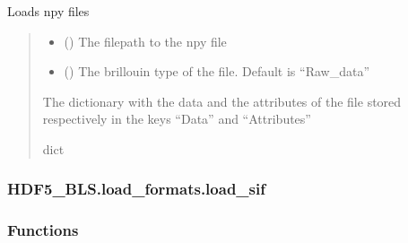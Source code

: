 \documentclass[letterpaper,10pt,english]{sphinxmanual}
\begin{document}
\begin{fulllineitems}
\label{\detokenize{_autosummary/HDF5_BLS.load_formats.load_npy:HDF5_BLS.load_formats.load_npy.load_npy_base}}
\pysigstartsignatures
\pysiglinewithargsret
{}
{\sphinxparamcomma {}}
{}
\pysigstopsignatures
\sphinxAtStartPar
Loads npy files
\begin{quote}\begin{description}
\begin{itemize}
\item {} 
\sphinxAtStartPar
{} () \textendash{} The filepath to the npy file

\item {} 
\sphinxAtStartPar
{} (\sphinxstyleliteralemphasis{\sphinxupquote{, }}) \textendash{} The brillouin type of the file. Default is “Raw\_data”

\end{itemize}

\sphinxAtStartPar
The dictionary with the data and the attributes of the file stored respectively in the keys “Data” and “Attributes”

\sphinxAtStartPar
dict

\end{description}\end{quote}

\end{fulllineitems}


\sphinxstepscope


\subsubsection{HDF5\_BLS.load\_formats.load\_sif}
\label{\detokenize{_autosummary/HDF5_BLS.load_formats.load_sif:module-HDF5_BLS.load_formats.load_sif}}\label{\detokenize{_autosummary/HDF5_BLS.load_formats.load_sif:hdf5-bls-load-formats-load-sif}}\label{\detokenize{_autosummary/HDF5_BLS.load_formats.load_sif::doc}}\subsubsection*{Functions}
\end{document}
